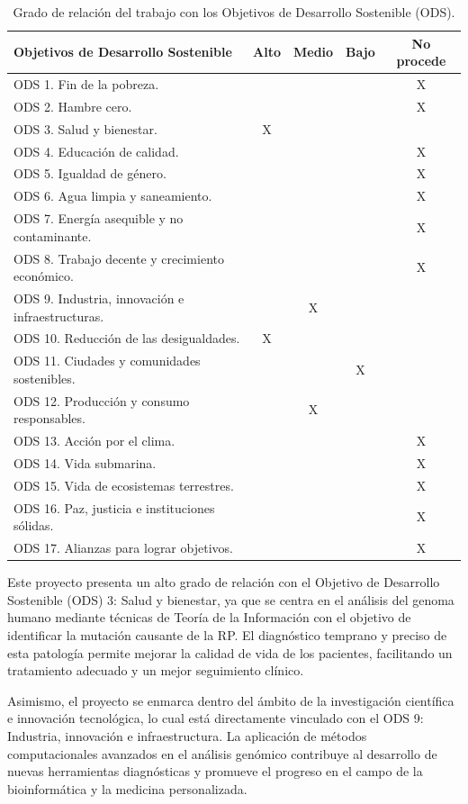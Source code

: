 \documentclass[11pt,spanish,listoffigures,listoftables]{tfgetsinf}
\begin{document}
\begin{table}[H]
\centering
\caption{Grado de relación del trabajo con los Objetivos de Desarrollo Sostenible (ODS).}
\begin{tabular}{|p{7cm}|c|c|c|c|}
\hline
\textbf{Objetivos de Desarrollo Sostenible} & \textbf{Alto} & \textbf{Medio} & \textbf{Bajo} & \textbf{No procede} \\
\hline
ODS 1. Fin de la pobreza. & & & & X \\
ODS 2. Hambre cero. & & & & X \\
ODS 3. Salud y bienestar. & X & & & \\
ODS 4. Educación de calidad. & & & & X \\
ODS 5. Igualdad de género. & & & & X \\
ODS 6. Agua limpia y saneamiento. & & & & X \\
ODS 7. Energía asequible y no contaminante. & & & & X \\
ODS 8. Trabajo decente y crecimiento económico. & & & & X \\
ODS 9. Industria, innovación e infraestructuras. & & X & & \\
ODS 10. Reducción de las desigualdades. & X & & & \\
ODS 11. Ciudades y comunidades sostenibles. & & & X & \\
ODS 12. Producción y consumo responsables. & & X & & \\
ODS 13. Acción por el clima. & & & & X \\
ODS 14. Vida submarina. & & & & X \\
ODS 15. Vida de ecosistemas terrestres. & & & & X \\
ODS 16. Paz, justicia e instituciones sólidas. & & & & X \\
ODS 17. Alianzas para lograr objetivos. & & & & X \\
\hline
\end{tabular}
\end{table}


Este proyecto presenta un alto grado de relación con el Objetivo de Desarrollo Sostenible (ODS) 3: Salud y bienestar, ya que se centra en el análisis del genoma humano mediante técnicas de Teoría de la Información con el objetivo de identificar la mutación causante de la RP. El diagnóstico temprano y preciso de esta patología permite mejorar la calidad de vida de los pacientes, facilitando un tratamiento adecuado y un mejor seguimiento clínico.

Asimismo, el proyecto se enmarca dentro del ámbito de la investigación científica e innovación tecnológica, lo cual está directamente vinculado con el ODS 9: Industria, innovación e infraestructura. La aplicación de métodos computacionales avanzados en el análisis genómico contribuye al desarrollo de nuevas herramientas diagnósticas y promueve el progreso en el campo de la bioinformática y la medicina personalizada.
\end{document}
